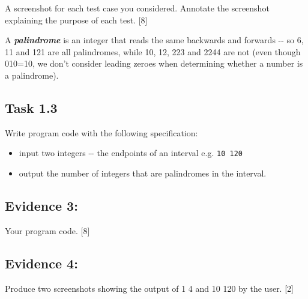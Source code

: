 A screenshot for each test case you considered. Annotate the screenshot
explaining the purpose of each test. \hfill{}{[}8{]}

A \textbf{\emph{palindrome}} is an integer that reads the same backwards
and forwards -{}- so 6, 11 and 121 are all palindromes, while 10,
12, 223 and 2244 are not (even though 010=10, we don't consider leading
zeroes when determining whether a number is a palindrome). 

\subsection*{Task 1.3 }

Write program code with the following specification: 
\begin{itemize}
\item input two integers -{}- the endpoints of an interval e.g. \texttt{10
120 }
\item output the number of integers that are palindromes in the interval. 
\end{itemize}

\subsection*{Evidence 3: }

Your program code. \hfill{}{[}8{]}

\subsection*{Evidence 4: }

Produce two screenshots showing the output of 1 4 and 10 120 by the
user.\hfill{} {[}2{]}